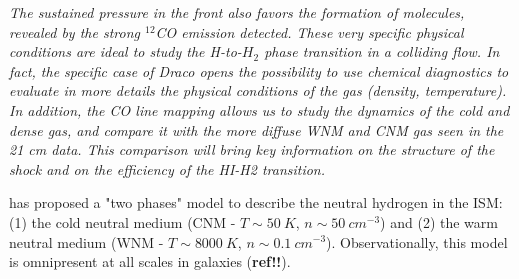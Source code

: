 \documentclass[traditabstract]{aa}
\begin{document}
\textit{   The sustained pressure in the front also favors the formation of molecules, revealed by the strong $^{12}$CO emission detected. These very specific physical conditions are ideal to study the H-to-$H_2$ phase transition in a colliding flow. In fact, the specific case of Draco opens the possibility to use chemical diagnostics to evaluate in more details the physical conditions of the gas (density, temperature). In addition, the CO line mapping allows us to study the dynamics of the cold and dense gas, and compare it with the more diffuse WNM and CNM gas seen in the 21 cm data. This comparison will bring key information on the structure of the shock and on the efficiency of the HI-H2 transition.}

\cite{Field_1969} has proposed a "two phases" model to describe the neutral hydrogen in the ISM: (1) the cold neutral medium (CNM - $T\sim 50\: K$, $n\sim 50\: cm^{-3}$) and (2) the warm neutral medium (WNM - $T\sim 8000\: K$, $n\sim 0.1\: cm^{-3}$). Observationally, this model is omnipresent at all scales in galaxies (\textbf{ref!!}).

%
%
\end{document}
